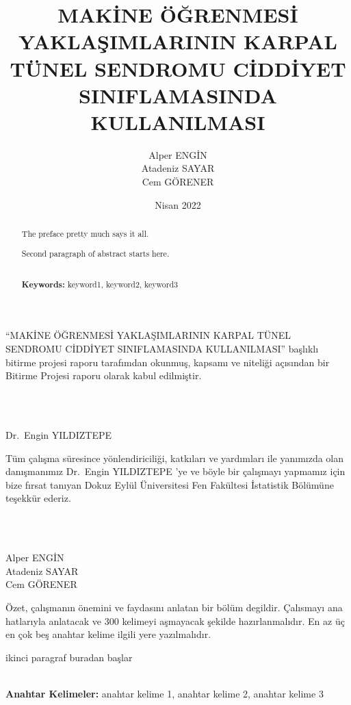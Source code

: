 \documentclass[12pt,twoside]{deuthesis}
\title{MAKİNE ÖĞRENMESİ YAKLAŞIMLARININ KARPAL TÜNEL SENDROMU CİDDİYET SINIFLAMASINDA KULLANILMASI}
\author{Alper ENGİN \\ Atadeniz SAYAR \\ Cem GÖRENER} %
\date{Nisan 2022}
\begin{document}
  \maketitle

\frontmatter %
\pagestyle{empty} %
\begin{preface}
	``MAKİNE ÖĞRENMESİ YAKLAŞIMLARININ KARPAL TÜNEL SENDROMU CİDDİYET SINIFLAMASINDA KULLANILMASI'' başlıklı bitirme projesi raporu tarafımdan okunmuş, kapsamı ve niteliği açısından bir Bitirme Projesi raporu olarak kabul edilmiştir.\\
 \strut \\
 \strut \\
 Dr.~Engin YILDIZTEPE
\end{preface}
  \begin{acknowledgements}
    Tüm çalışma süresince yönlendiriciliği, katkıları ve yardımları ile yanımızda olan danışmanımız Dr.~Engin YILDIZTEPE 'ye ve böyle bir çalışmayı yapmamız için bize fırsat tanıyan Dokuz Eylül Üniversitesi Fen Fakültesi İstatistik Bölümüne teşekkür ederiz.\\
    \strut \\
    \strut \\
    Alper ENGİN\\
    Atadeniz SAYAR\\
    Cem GÖRENER\\
  \end{acknowledgements}
\begin{abstractTR}
	Özet, çalışmanın önemini ve faydasını anlatan bir bölüm degildir. Çalısmayı ana
 hatlarıyla anlatacak ve 300 kelimeyi aşmayacak şekilde hazırlanmalıdır. En az üç en
 çok beş anahtar kelime ilgili yere yazılmalıdır.

 \par

 ikinci paragraf buradan başlar\\
 \strut \\
 \textbf{Anahtar Kelimeler:} anahtar kelime 1, anahtar kelime 2, anahtar kelime 3
\end{abstractTR}
\begin{abstract}
	The preface pretty much says it all.

 \par

 Second paragraph of abstract starts here.\\
 \strut \\
 \textbf{Keywords:} keyword1, keyword2, keyword3
\end{abstract}
\end{document}
